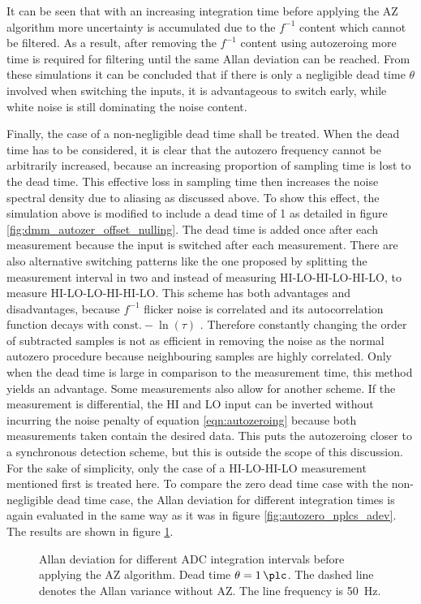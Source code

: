 It can be seen that with an increasing integration time before applying the AZ algorithm more uncertainty is accumulated due to the $f^{-1}$ content which cannot be filtered. As a result, after removing the $f^{-1}$ content using autozeroing more time is required for filtering until the same Allan deviation can be reached. From these simulations it can be concluded that if there is only a negligible dead time $\theta$ involved when switching the inputs, it is advantageous to switch early, while white noise is still dominating the noise content.%

Finally, the case of a non-negligible dead time shall be treated. When the dead time has to be considered, it is clear that the autozero frequency cannot be arbitrarily increased, because an increasing proportion of sampling time is lost to the dead time. This effective loss in sampling time then increases the noise spectral density due to aliasing as discussed above. To show this effect, the simulation above is modified to include a dead time of \qty{1}{\plc} as detailed in figure \ref{fig:dmm_autozer_offset_nulling}. The dead time is added once after each measurement because the input is switched after each measurement. There are also alternative switching patterns like the one proposed by \citeauthor{autozero_with_dead_time} \cite{autozero_with_dead_time} splitting the measurement interval in two and instead of measuring HI-LO-HI-LO-HI-LO, to measure HI-LO-LO-HI-HI-LO. This scheme has both advantages and disadvantages, because $f^{-1}$ flicker noise is correlated and its autocorrelation function decays with $\text{const.} - \ln(\tau)$ \cite{flicker_noise_autocorrelation,flicker_noise_autocorrelation2}. Therefore constantly changing the order of subtracted samples is not as efficient in removing the noise as the normal autozero procedure because neighbouring samples are highly correlated. Only when the dead time is large in comparison to the measurement time, this method yields an advantage. Some measurements also allow for another scheme. If the measurement is differential, the HI and LO input can be inverted without incurring the noise penalty of equation \ref{eqn:autozeroing} because both measurements taken contain the desired data. This puts the autozeroing closer to a synchronous detection scheme, but this is outside the scope of this discussion. For the sake of simplicity, only the case of a HI-LO-HI-LO measurement mentioned first is treated here. To compare the zero dead time case with the non-negligible dead time case, the Allan deviation for different integration times is again evaluated in the same way as it was in figure \ref{fig:autozero_nplcs_adev}. The results are shown in figure \ref{fig:autozero_deadtime_nplcs_adev}.
\begin{figure}[ht]
    \centering
    \caption{Allan deviation for different ADC integration intervals before applying the AZ algorithm. Dead time $\theta = \qty{1}{\plc}$. The dashed line denotes the Allan variance without AZ. The line frequency is \qty{50}{\Hz}.}
    \label{fig:autozero_deadtime_nplcs_adev}
\end{figure}

